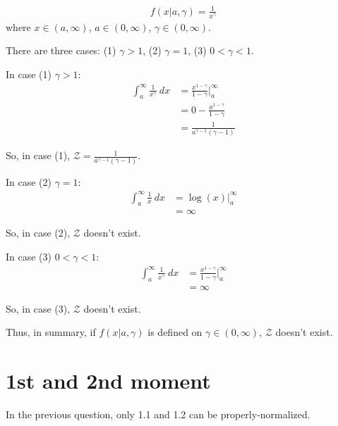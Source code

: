 
\subsection{}
\begin{align*}
    f(x|a,\gamma)=\frac{1}{x^\gamma}
\end{align*}
where $x \in (a, \infty)$, $a \in (0, \infty)$, $\gamma \in (0, \infty)$.

There are three cases: (1) $\gamma>1$, (2) $\gamma=1$, (3) $0<\gamma<1$.

In case (1) $\gamma>1$:
\begin{align*}
    \int_a^{\infty} \frac{1}{x^{\gamma}} \ dx
    &= \frac{x^{1-\gamma}}{1-\gamma} \biggr\rvert _a^{\infty} \\
    &= 0 - \frac{a^{1-\gamma}}{1-\gamma} \\
    &= \frac{1}{a^{\gamma-1} (\gamma-1)}
\end{align*}

So, in case (1), $\mathcal{Z} = \frac{1}{a^{\gamma-1} (\gamma-1)}$.

In case (2) $\gamma=1$:
\begin{align*}
    \int_a^{\infty} \frac{1}{x} \ dx
    &= \log(x) \biggr\rvert _a^{\infty} \\
    &= \infty
\end{align*}

So, in case (2), $\mathcal{Z}$ doesn't exist.

In case (3) $0<\gamma<1$:
\begin{align*}
    \int_a^{\infty} \frac{1}{x^{\gamma}} \ dx
    &= \frac{x^{1-\gamma}}{1-\gamma} \biggr\rvert _a^{\infty} \\
    &= \infty    
\end{align*}

So, in case (3), $\mathcal{Z}$ doesn't exist.

Thus, in summary, if $f(x|a,\gamma)$ is defined on $\gamma \in (0, \infty)$, $\mathcal{Z}$ doesn't exist.

\section{1st and 2nd moment}
In the previous question, only 1.1 and 1.2 can be properly-normalized.

